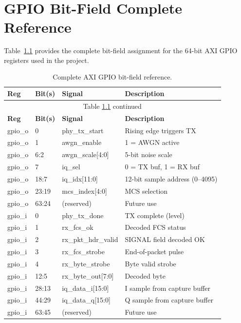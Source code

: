 \documentclass[12pt, a4paper, oneside]{report}
\begin{document}
\appendix

\chapter{GPIO Bit-Field Complete Reference}

Table~\ref{tab:gpio_full} provides the complete bit-field assignment for the 64-bit AXI GPIO registers used in the project.

\begin{longtable}{lllp{6cm}}
  \caption{Complete AXI GPIO bit-field reference.}
  \label{tab:gpio_full} \\
  \toprule
  \textbf{Reg} & \textbf{Bit(s)} & \textbf{Signal} & \textbf{Description} \\
  \midrule
  \endfirsthead
  \multicolumn{4}{c}{Table \ref{tab:gpio_full} continued} \\
  \toprule
  \textbf{Reg} & \textbf{Bit(s)} & \textbf{Signal} & \textbf{Description} \\
  \midrule
  \endhead
  \bottomrule
  \endfoot
  gpio\_o & 0     & phy\_tx\_start     & Rising edge triggers TX \\
  gpio\_o & 1     & awgn\_enable       & 1 = AWGN active \\
  gpio\_o & 6:2   & awgn\_scale[4:0]   & 5-bit noise scale \\
  gpio\_o & 7     & iq\_sel            & 0 = TX buf, 1 = RX buf \\
  gpio\_o & 18:7  & iq\_idx[11:0]      & 12-bit sample address (0--4095) \\
  gpio\_o & 23:19 & mcs\_index[4:0]    & MCS selection \\
  gpio\_o & 63:24 & (reserved)         & Future use \\
  \midrule
  gpio\_i & 0     & phy\_tx\_done      & TX complete (level) \\
  gpio\_i & 1     & rx\_fcs\_ok        & Decoded FCS status \\
  gpio\_i & 2     & rx\_pkt\_hdr\_valid & SIGNAL field decoded OK \\
  gpio\_i & 3     & rx\_fcs\_strobe    & End-of-packet pulse \\
  gpio\_i & 4     & rx\_byte\_strobe   & Byte valid strobe \\
  gpio\_i & 12:5  & rx\_byte\_out[7:0] & Decoded byte \\
  gpio\_i & 28:13 & iq\_data\_i[15:0]  & I sample from capture buffer \\
  gpio\_i & 44:29 & iq\_data\_q[15:0]  & Q sample from capture buffer \\
  gpio\_i & 63:45 & (reserved)         & Future use \\
\end{longtable}
\end{document}

